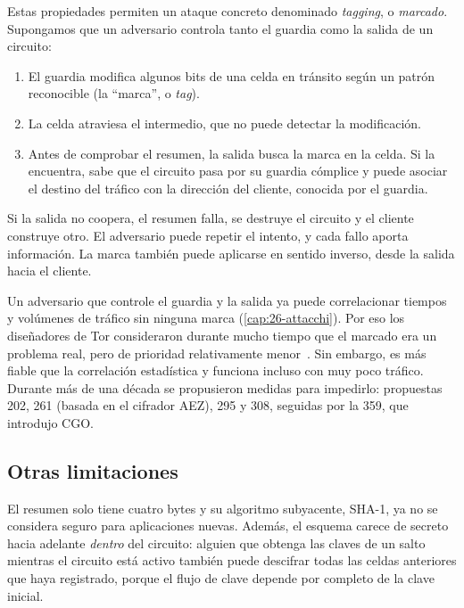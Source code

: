 Estas propiedades permiten un ataque concreto denominado \emph{tagging}, o \emph{marcado}. Supongamos que un adversario controla tanto el guardia como la salida de un circuito:
\begin{enumerate}
  \item El guardia modifica algunos bits de una celda en tránsito según un patrón reconocible (la \enquote{marca}, o \emph{tag}).
  \item La celda atraviesa el intermedio, que no puede detectar la modificación.
  \item Antes de comprobar el resumen, la salida busca la marca en la celda. Si la encuentra, sabe que el circuito pasa por su guardia cómplice y puede asociar el destino del tráfico con la dirección del cliente, conocida por el guardia.
\end{enumerate}
Si la salida no coopera, el resumen falla, se destruye el circuito y el cliente construye otro. El adversario puede repetir el intento, y cada fallo aporta información. La marca también puede aplicarse en sentido inverso, desde la salida hacia el cliente.

\begin{approfondimento}
Un adversario que controle el guardia y la salida ya puede correlacionar tiempos y volúmenes de tráfico sin ninguna marca (\cref{cap:26-attacchi}). Por eso los diseñadores de Tor consideraron durante mucho tiempo que el marcado era un problema real, pero de prioridad relativamente menor~\cite{dingledine2004tor}. Sin embargo, es más fiable que la correlación estadística y funciona incluso con muy poco tráfico. Durante más de una década se propusieron medidas para impedirlo: propuestas 202, 261 (basada en el cifrador AEZ), 295 y 308, seguidas por la 359, que introdujo CGO.
\end{approfondimento}

\subsection{Otras limitaciones}

El resumen solo tiene cuatro bytes y su algoritmo subyacente, SHA-1, ya no se considera seguro para aplicaciones nuevas. Además, el esquema carece de secreto hacia adelante \emph{dentro} del circuito: alguien que obtenga las claves de un salto mientras el circuito está activo también puede descifrar todas las celdas anteriores que haya registrado, porque el flujo de clave depende por completo de la clave inicial.

